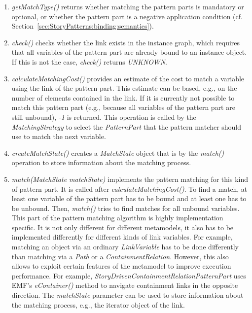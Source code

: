 \begin{enumerate}
	\item \emph{getMatchType()} returns whether matching the pattern parts is mandatory or optional, or whether the pattern part is a negative application condition (cf. Section~\ref{sec:StoryPatterns:binding:semantics}). 
	
	\item \emph{check()} checks whether the link exists in the instance graph, which requires that all variables of the pattern part are already bound to an instance object. 
	If this is not the case, \emph{check()} returns \emph{UNKNOWN}. 

	\item \emph{calculateMatchingCost()} provides an estimate of the cost to match a variable using the link of the pattern part. 
	This estimate can be based, e.g., on the number of elements contained in the link.
	If it is currently not possible to match this pattern part (e.g., because all variables of the pattern part are still unbound), \emph{-1} is returned.
	This operation is called by the \emph{MatchingStrategy} to select the \emph{PatternPart} that the pattern matcher should use to match the next variable.

	\item \emph{createMatchState()} creates a \emph{MatchState} object that is by the \emph{match()} operation to store information about the matching process.

	\item \emph{match(MatchState matchState)} implements the pattern matching for this kind of pattern part. 
	It is called after \emph{calculateMatchingCost()}. 
	To find a match, at least one variable of the pattern part has to be bound and at least one has to be unbound. 
	Then, \emph{match()} tries to find matches for all unbound variables. 
	This part of the pattern matching algorithm is highly implementation specific. 
	It is not only different for different metamodels,
	it also has to be implemented differently for different kinds of link variables.
	For example, matching an object via an ordinary \emph{LinkVariable} has to be done differently than matching via a \emph{Path} or a \emph{ContainmentRelation}.
	However, this also allows to exploit certain features of the metamodel to improve execution performance. 
	For example, \emph{StoryDrivenContainmentRelationPatternPart} uses EMF's \emph{eContainer()} method to navigate containment links in the opposite direction.	
	The \emph{matchState} parameter can be used to store information about the matching process, e.g., the iterator object of the link.
	

\end{enumerate}
